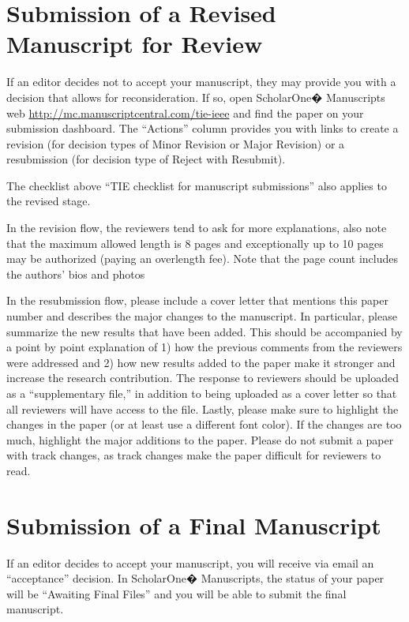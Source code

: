 \documentclass[journal]{IEEEtranTICPS}
\begin{document}
\section{Submission of a Revised Manuscript for Review}

If an editor decides not to accept your manuscript, they may provide you with a decision that allows for reconsideration. If so, open ScholarOne� Manuscripts web \url{http://mc.manuscriptcentral.com/tie-ieee} and find the paper on your submission dashboard. The ``Actions'' column provides you with links to create a revision (for decision types of Minor Revision or Major Revision) or a resubmission (for decision type of Reject with Resubmit).

The checklist above ``TIE checklist for manuscript submissions'' also applies to the revised stage.

In the revision flow, the reviewers tend to ask for more explanations, also note that the maximum allowed length is 8 pages and exceptionally up to 10 pages may be authorized (paying an overlength fee). Note that the page count includes the authors' bios and photos

In the resubmission flow, please include a cover letter that mentions this paper number and describes the major changes to the manuscript. In particular, please summarize the new results that have been added. This should be accompanied by a point by point explanation of 1) how the previous comments from the reviewers were addressed and 2) how new results added to the paper make it stronger and increase the research contribution. The response to reviewers should be uploaded as a ``supplementary file,'' in addition to being uploaded as a cover letter so that all reviewers will have access to the file. Lastly, please make sure to highlight the changes in the paper (or at least use a different font color). If the changes are too much, highlight the major additions to the paper. Please do not submit a paper with track changes, as track changes make the paper difficult for reviewers to read.


\section{Submission of a Final Manuscript}

If an editor decides to accept your manuscript, you will receive via email an ``acceptance'' decision. In ScholarOne� Manuscripts, the status of your paper will be ``Awaiting Final Files'' and you will be able to submit the final manuscript.
\end{document}
